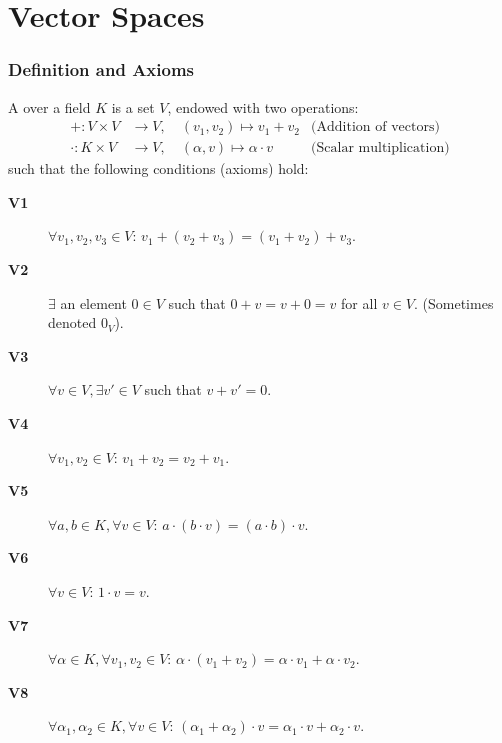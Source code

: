 \setcounter{chapter}{6}
\renewcommand{\thetheorem}{\thechapter.\arabic{theorem}}
\setcounter{theorem}{0}

\chapter{Vector Spaces}

\subsection{Definition and Axioms}

\begin{definition}
A  over a field $K$ is a set $V$, endowed with two operations:
\begin{align*}
+: V \times V &\longrightarrow V, \quad (v_1, v_2) \mapsto v_1 + v_2  &\text{(Addition of vectors)} \\
\cdot: K \times V &\longrightarrow V, \quad (\alpha, v) \mapsto \alpha \cdot v  &\text{(Scalar multiplication)}
\end{align*}
such that the following conditions (axioms) hold:
\begin{description}
    \item[\textbf{V1}] $\forall v_1, v_2, v_3 \in V$: $v_1 + (v_2 + v_3) = (v_1 + v_2) + v_3$.
    \item[\textbf{V2}] $\exists$ an element $0 \in V$ such that $0 + v = v + 0 = v$ for all $v \in V$. (Sometimes denoted $0_V$).
    \item[\textbf{V3}] $\forall v \in V, \exists v' \in V$ such that $v + v' = 0$.
    \item[\textbf{V4}] $\forall v_1, v_2 \in V$: $v_1 + v_2 = v_2 + v_1$.
    \item[\textbf{V5}] $\forall a, b \in K, \forall v \in V$: $a \cdot (b \cdot v) = (a \cdot b) \cdot v$.
    \item[\textbf{V6}] $\forall v \in V$: $1 \cdot v = v$.
    \item[\textbf{V7}] $\forall \alpha \in K, \forall v_1, v_2 \in V$: $\alpha \cdot (v_1 + v_2) = \alpha \cdot v_1 + \alpha \cdot v_2$.
    \item[\textbf{V8}] $\forall \alpha_1, \alpha_2 \in K, \forall v \in V$: $(\alpha_1 + \alpha_2) \cdot v = \alpha_1 \cdot v + \alpha_2 \cdot v$.
\end{description}
\end{definition}

